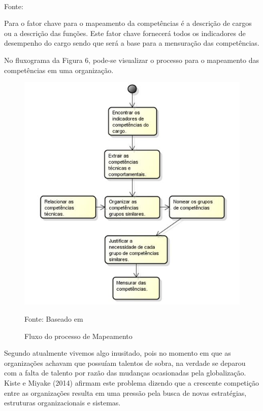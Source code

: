 \begin{quadro}[htbp]
\begin{tabular}{|l|l|}
		\\
		\hline
	\end{tabular}
	\vspace{2mm}
	\\ \footnotesize Fonte: 
\end{quadro}


Para  o fator chave para o mapeamento da competências é a descrição de cargos ou a descrição das funções. Este fator chave fornecerá todos os indicadores de desempenho do cargo sendo que será a base para a mensuração das competências.

No fluxograma da Figura 6, pode-se visualizar o processo para o mapeamento das competências em uma organização.

\begin{figure}[htbp]
	\centering
	\label{fig:fluxo_mapeamento}
	\caption{Fluxo do processo de Mapeamento}
	\centering
	\includegraphics[width=1.0\textwidth]{figuras/fluxo_mapeamento.jpg}

	\footnotesize Fonte: Baseado em 
\end{figure}

Segundo  atualmente vivemos algo inusitado, pois no momento em que as organizações achavam que possuíam talentos de sobra, na verdade se deparou com a falta de talento por razão das mudanças ocasionadas pela globalização. Kiste e Miyake (2014) afirmam este problema dizendo que a crescente competição entre as organizações resulta em uma pressão pela busca de novas estratégias, estruturas organizacionais e sistemas.


